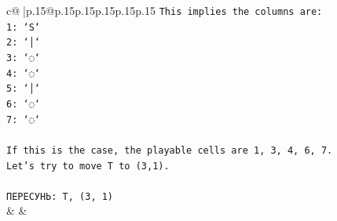 \documentclass{article}
\begin{document}
{\begin{supertabular}{c@{$\;$}|p{.15\linewidth}@{}p{.15\linewidth}p{.15\linewidth}p{.15\linewidth}p{.15\linewidth}p{.15\linewidth}}
{{{\texttt{This implies the columns are:} \\
\texttt{1: `S`} \\
\texttt{2: `│`} \\
\texttt{3: `◌`} \\
\texttt{4: `◌`} \\
\texttt{5: `│`} \\
\texttt{6: `◌`} \\
\texttt{7: `◌`} \\
\\ 
\texttt{If this is the case, the playable cells are 1, 3, 4, 6, 7.} \\
\texttt{Let's try to move T to (3,1).} \\
\\ 
\texttt{ПЕРЕСУНЬ: T, (3, 1)} \\
            }
        }
    }
    & & \\ \\


\end{supertabular}}
\end{document}
